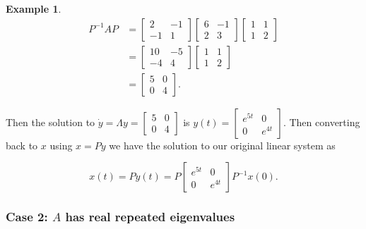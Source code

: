 \documentclass[12pt]{article}
\theoremstyle{definition}
\newtheorem*{example}{Example}
\begin{document}
\begin{example}
\begin{equation*}
\begin{split}
P^{-1}AP &=
\begin{bmatrix}
2 & -1 \\
-1 & 1
\end{bmatrix}
\begin{bmatrix}
6 & -1 \\
2 & 3
\end{bmatrix}
\begin{bmatrix}
1 & 1 \\
1 & 2
\end{bmatrix} \\
&=
\begin{bmatrix}
10 & -5 \\
-4 & 4
\end{bmatrix}
\begin{bmatrix}
1 & 1 \\
1 & 2
\end{bmatrix} \\
&=
\begin{bmatrix}
5 & 0 \\
0 & 4
\end{bmatrix}.
\end{split}
\end{equation*}

Then the solution to $\dot y = \Lambda y = \begin{bmatrix} 5 & 0 \\ 0 & 4 \end{bmatrix}$ is 
$y(t) = \begin{bmatrix} e^{5t} & 0 \\ 0 & e^{4t} \end{bmatrix}$. Then converting back to $x$ 
using $x = Py$ we have the solution to our original linear system as

\begin{equation*}
x(t) = Py(t) = P \begin{bmatrix} e^{5t} & 0 \\ 0 & e^{4t} \end{bmatrix} P^{-1} x(0).
\end{equation*}


\end{example}


\subsubsection{Case 2: $A$ has real repeated eigenvalues}
\end{document}

